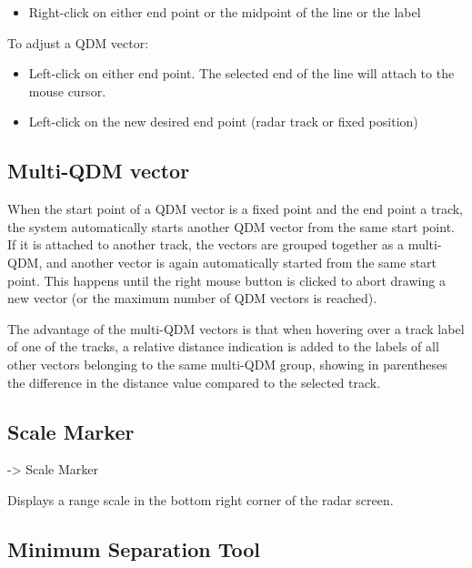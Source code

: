\documentclass[a4paper,oneside,11pt]{memoir}
\begin{document}
\begin{itemize}
    \item Right-click on either end point or the midpoint of the line or the label
\end{itemize}

\bigskip

To adjust a QDM vector:

\begin{itemize}
    \item Left-click on either end point. The selected end of the line will attach to the mouse cursor.
    \item Left-click on the new desired end point (radar track or fixed position)
\end{itemize}

\subsection{Multi-QDM vector}

When the start point of a QDM vector is a fixed point and the end point a track, the system automatically starts another QDM vector from the same start point. If it is attached to another track, the vectors are grouped together as a multi-QDM, and another vector is again automatically started from the same start point. This happens until the right mouse button is clicked to abort drawing a new vector (or the maximum number of QDM vectors is reached).

\bigskip

The advantage of the multi-QDM vectors is that when hovering over a track label of one of the tracks, a relative distance indication is added to the labels of all other vectors belonging to the same multi-QDM group, showing in parentheses the difference in the distance value compared to the selected track.

\subsection{Scale Marker}
\label{scale}

 -> Scale Marker


Displays a range scale in the bottom right corner of the radar screen.

\subsection{Minimum Separation Tool}
\label{tool:mst}
\end{document}
